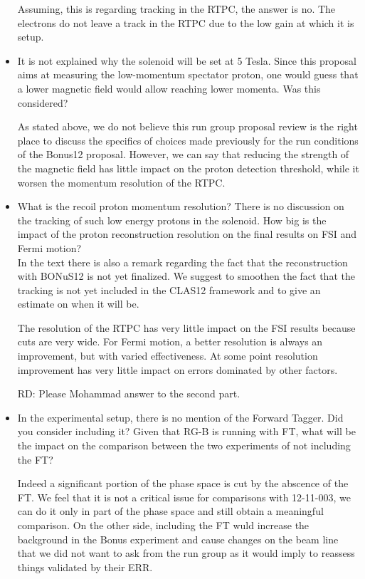 \begin{itemize}
{\color{red} Assuming, this is regarding tracking in the RTPC, the answer is no. The electrons do not leave a track in the
RTPC due to the low gain at which it is setup.}

 \item It is not explained why the solenoid will be set at 5 Tesla. Since this proposal aims at measuring the low-momentum spectator proton, one would guess that a lower magnetic field would allow reaching lower momenta. Was this considered?
 
{\color{red} As stated above, we do not believe this run group proposal review is the right place to discuss the specifics of 
choices made previously for the run conditions of the Bonus12 proposal. However, we can say that reducing the 
strength of the magnetic field has little impact on the proton detection threshold, while it worsen the momentum
resolution of the RTPC.}

 \item What is the recoil proton momentum resolution? There is no discussion on the tracking of such low energy protons in the solenoid. How big is the impact of the proton reconstruction resolution on the final results on FSI and Fermi motion?
 \\In the text there is also a remark regarding the fact that the reconstruction with BONuS12 is not yet finalized. We suggest to smoothen the fact that the tracking is not yet included in the CLAS12 framework and to give an estimate on when it will be.
 
{\color{red} The resolution of the RTPC has very little impact on the FSI results because cuts are very wide. For Fermi
motion, a better resolution is always an improvement, but with varied effectiveness. At some point resolution 
improvement has very little impact on errors dominated by other factors.

RD: Please Mohammad answer to the second part.}

 \item In the experimental setup, there is no mention of the Forward Tagger. Did you consider including it? Given that RG-B is running with FT, what will be the impact on the comparison between the two experiments of not including the FT?
 
{\color{red} Indeed a significant portion of the phase space is cut by the abscence of the FT. We feel that it is not a 
critical issue for comparisons with 12-11-003, we can do it only in part of the phase space and still obtain
a meaningful comparison. On the other side, including the FT wuld increase the background in the Bonus 
experiment and cause changes on the beam line that we did not want to ask from the run group as it would imply 
to reassess things validated by their ERR.}


\end{itemize}
